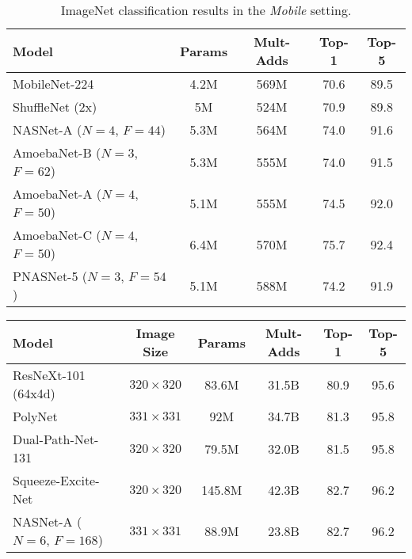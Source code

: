 \documentclass[runningheads]{llncs}
\begin{document}
\begin{table}[t]
\begin{center}
    \begin{tabular}{lcccc}
    \toprule
         Model &  Params & Mult-Adds & Top-1 & Top-5 \\
        \midrule
        MobileNet-224 \cite{DBLP:journals/corr/HowardZCKWWAA17} & 4.2M & 569M & 70.6 & 89.5 \\
        ShuffleNet (2x) \cite{DBLP:journals/corr/ZhangZLS17} & 5M & 524M & 70.9 & 89.8 \\
        \midrule
        NASNet-A ($N=4$, $F=44$)
        \cite{DBLP:journals/corr/ZophVSL17} & 5.3M & 564M & 74.0 & 91.6 \\
        AmoebaNet-B ($N=3$, $F=62$) \cite{DBLP:journals/corr/abs-1802-01548} & 5.3M & 555M & 74.0 & 91.5 \\
        AmoebaNet-A ($N=4$, $F=50$) \cite{DBLP:journals/corr/abs-1802-01548} & 5.1M & 555M & 74.5 & 92.0 \\
        AmoebaNet-C ($N=4$, $F=50$) \cite{DBLP:journals/corr/abs-1802-01548} & 6.4M & 570M & 75.7 & 92.4 \\
        \midrule
        PNASNet-5 ($N=3$, $F=54$) & 5.1M & 588M & 74.2 & 91.9 \\
    \bottomrule
    \end{tabular}
\end{center}
\caption{ImageNet classification results in the \textit{Mobile} setting.
}
\label{tab:imagenet-mobile}
\end{table}\begin{table}[t]
\begin{center}
    \begin{tabular}{lccccc}
    \toprule
        Model & Image Size & Params & Mult-Adds & Top-1 & Top-5 \\
        \midrule
        ResNeXt-101 (64x4d) \cite{DBLP:journals/corr/XieGDTH16} & $320 \times 320$ & 83.6M & 31.5B & 80.9 & 95.6\\
        PolyNet \cite{DBLP:journals/corr/ZhangLLL16} & $331 \times 331$ & 92M & 34.7B & 81.3 & 95.8\\
        Dual-Path-Net-131 \cite{DBLP:journals/corr/ChenLXJYF17} & $320 \times 320$ & 79.5M & 32.0B & 81.5 & 95.8\\
        Squeeze-Excite-Net \cite{DBLP:journals/corr/abs-1709-01507} & $320 \times 320$ & 145.8M & 42.3B & 82.7 & 96.2\\
        \midrule
        NASNet-A ($N=6$, $F=168$) \cite{DBLP:journals/corr/ZophVSL17} & $331 \times 331$ & 88.9M & 23.8B & 82.7 & 96.2\\

\end{tabular}
\end{center}
\end{table}
\end{document}
